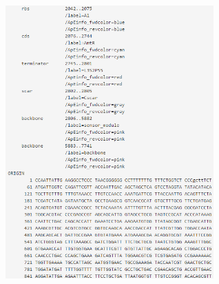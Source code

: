 \documentclass[11pt]{article}
\begin{document}
\begin{figure}[ht!]
\includegraphics[width=8cm,height=20cm,keepaspectratio]{fout_2.png}
\label{sbol and plasmid log snapshots}
\end{figure}





 
\end{document}
